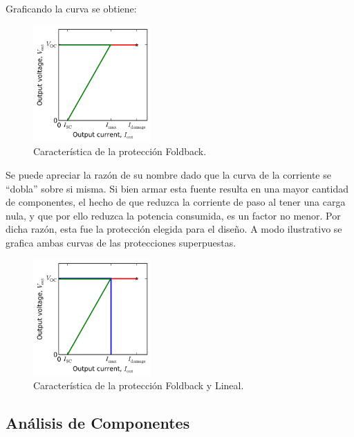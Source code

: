 Graficando la curva se obtiene:
\begin{figure}[H]
\centering
	\includegraphics[width=0.4\textwidth]{ImagenesEjercicio2/foldbackLineal.png}
	\caption{Característica de la protección Foldback.}
	\label{fig:circuitofoldbackcarac}
\end{figure}
Se puede apreciar la razón de su nombre dado que la curva de la corriente se ``dobla'' sobre si misma. Si bien armar esta fuente resulta en una mayor cantidad de componentes, el hecho de que reduzca la corriente de paso al tener una carga nula, y que por ello reduzca la potencia consumida, es un factor no menor. Por dicha razón, esta fue la protección elegida para el diseño. A modo ilustrativo se grafica ambas curvas de las protecciones superpuestas.
\begin{figure}[H]
\centering
	\includegraphics[width=0.4\textwidth]{ImagenesEjercicio2/foldback.png}
	\caption{Característica de la protección Foldback y Lineal.}
	\label{fig:circuitofoldbacklinealcarac}
\end{figure}

\subsection{Análisis de Componentes}
